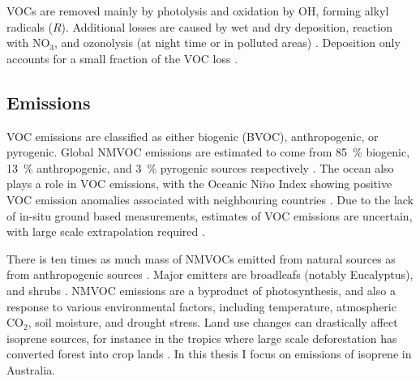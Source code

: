   VOCs are removed mainly by photolysis and oxidation by OH, forming alkyl 
  radicals ($R\dot{}$).
  Additional losses are caused by wet and dry deposition, reaction with NO$_3$, and ozonolysis (at night time or in polluted areas) \parencite{AtkinsonArey2003, Brown2009}.
  Deposition only accounts for a small fraction of the VOC loss 
  \parencite{AtkinsonArey2003}.
  
  
  \subsection{Emissions}
    \label{LR:VOCs:Emissions}
    
    VOC emissions are classified as either biogenic (BVOC), anthropogenic, or pyrogenic.
    Global NMVOC emissions are estimated to come from 85~\% biogenic, 13~\% 
    anthropogenic, and 3~\% pyrogenic sources respectively 
    \parencite{Kanakidou2005, Kefauver2014}.
    The ocean also plays a role in VOC emissions, with the Oceanic 
    Ni$\tilde{n}$o Index showing positive VOC emission anomalies associated 
    with neighbouring countries \parencite{Stavrakou2014}.
    Due to the lack of in-situ ground based measurements, estimates of VOC 
    emissions are uncertain, with large scale extrapolation required 
    \parencite{Millet2006}.
    
    
    There is ten times as much mass of NMVOCs emitted from natural sources as 
    from anthropogenic sources \parencite{Guenther2006, Kanakidou2005, 
    Millet2006}.
    Major emitters are broadleafs (notably Eucalyptus), and shrubs \parencite{Guenther2006, Arneth2008, Niinemets2010, Monks2015}.
    NMVOC emissions are a byproduct of photosynthesis, and also a response to 
    various environmental factors, including temperature, atmospheric CO$_2$, 
    soil moisture, and drought stress.
    Land use changes can drastically affect isoprene sources, for instance in the tropics where large scale deforestation has converted forest into crop lands \parencite{Kanakidou2005}.
    In this thesis I focus on emissions of isoprene in Australia.
    

